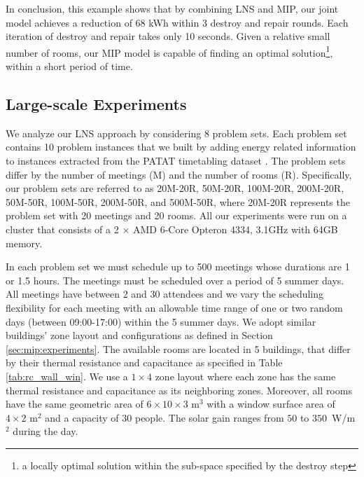 In conclusion, this example shows that by combining LNS and MIP, our joint model achieves a reduction of 68 kWh within 3 destroy and repair rounds. Each iteration of destroy and repair takes only 10 seconds.  Given a relative small number of rooms, our MIP model is capable of finding an optimal solution\footnote{a locally optimal solution within the sub-space specified by the destroy step}, within a short period of time. 


\subsection{Large-scale Experiments}

We analyze our LNS approach by considering 8 problem sets. Each problem set contains 10 problem instances that we built by adding energy related information to instances extracted from the PATAT timetabling dataset \citep{patat02}. The problem sets differ by the number of meetings (M) and the number of rooms (R). Specifically, our problem sets are referred to as 20M-20R, 50M-20R, 100M-20R, 200M-20R, 50M-50R, 100M-50R, 200M-50R, and 500M-50R, where 20M-20R represents the problem set with 20 meetings and 20 rooms. All our experiments were run on a cluster that consists of a 2 $\times$ AMD 6-Core Opteron 4334, 3.1GHz with 64GB memory.

In each problem set we must schedule up to 500 meetings whose durations are 1 or 1.5 hours. The meetings must be scheduled over a period of 5 summer days. All meetings have between 2 and 30 attendees and we vary the scheduling flexibility for each meeting with an allowable time range of one or two random days (between 09:00-17:00) within the 5 summer days. 
We adopt similar buildings' zone layout and configurations as defined in Section \ref{sec:mip:experiments}. 
The available rooms are located in 5 buildings, that differ by their thermal resistance and capacitance as specified in Table \ref{tab:rc_wall_win}. We use a $1\times4$ zone layout where each zone has the same thermal resistance and capacitance as its neighboring zones. Moreover, all rooms have the same geometric area of $6\times10\times3$ m$^3$ with a window surface area of $4\times2$ m$^2$ and a capacity of 30 people. The solar gain ranges from $50$ to $350$~W/m$^2$ during the day. 


